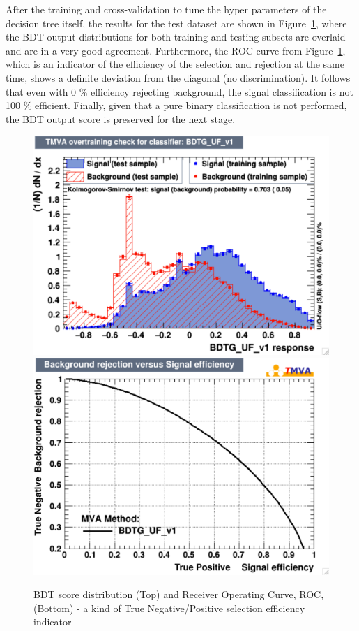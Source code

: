 After the training and cross-validation to tune the hyper parameters of the decision tree itself, the results for the test dataset are shown in Figure~\ref{fig:higgs_categorization_bdtoutputroc}, where the BDT output distributions for both training and testing subsets are overlaid and are in a very good agreement. Furthermore, the ROC curve from Figure~\ref{fig:higgs_categorization_bdtoutputroc}, which is an indicator of the efficiency of the selection and rejection at the same time, shows a definite deviation from the diagonal (no discrimination). It follows that even with 0 \% efficiency rejecting background, the signal classification is not 100 \% efficient. Finally, given that a pure binary classification is not performed, the BDT output score is preserved for the next stage.
\begin{figure}[htbp]
  \centering
  \includegraphics[width=0.75\linewidth]{figures/bdt_training/BDT_out_ge0j_all.pdf}\\
  \includegraphics[width=0.75\linewidth]{figures/bdt_training/BDT_ROC_ge0j_all.pdf}
  \caption{BDT score distribution (Top) and Receiver Operating Curve, ROC, (Bottom) - a kind of True Negative/Positive selection efficiency indicator}
  \label{fig:higgs_categorization_bdtoutputroc}
\end{figure}

